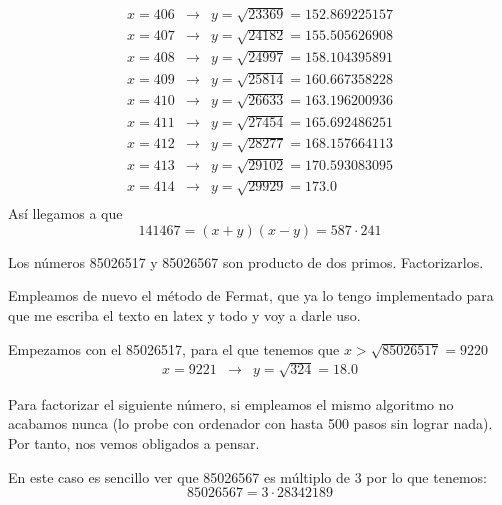 \begin{problem}[4]
\[\begin{array}{lcl}
x= 406  & \to &  y=\sqrt{ 23369 }= 152.869225157 \\
x= 407  & \to &  y=\sqrt{ 24182 }= 155.505626908 \\
x= 408  & \to &  y=\sqrt{ 24997 }= 158.104395891 \\
x= 409  & \to &  y=\sqrt{ 25814 }= 160.667358228 \\
x= 410  & \to &  y=\sqrt{ 26633 }= 163.196200936 \\
x= 411  & \to &  y=\sqrt{ 27454 }= 165.692486251 \\
x= 412  & \to &  y=\sqrt{ 28277 }= 168.157664113 \\
x= 413  & \to &  y=\sqrt{ 29102 }= 170.593083095 \\
x= 414  & \to &  y=\sqrt{ 29929 }= 173.0 \\
\end{array}\]
Así llegamos a que
\[141467 = (x+y)(x-y) = 587 \cdot 241\]
\end{problem}


\begin{problem}[5]
Los números 85026517 y 85026567 son producto de dos
primos. Factorizarlos.
\solution


Empleamos de nuevo el método de Fermat, que ya lo tengo implementado para que me escriba el texto en latex y todo y voy a darle uso.

Empezamos con el 85026517, para el que tenemos que $x> \sqrt{85026517}=9220$
\[\begin{array}{lcl}
x= 9221 & \to & y=\sqrt{ 324}= 18.0
\end{array}\]

Para factorizar el siguiente número, si empleamos el mismo algoritmo no acabamos nunca (lo probe con ordenador con hasta 500 pasos sin lograr nada). Por tanto, nos vemos obligados a pensar.

En este caso es sencillo ver que 85026567 es múltiplo de 3 por lo que tenemos:
\[85026567 = 3 \cdot 28342189\]
\end{problem}


